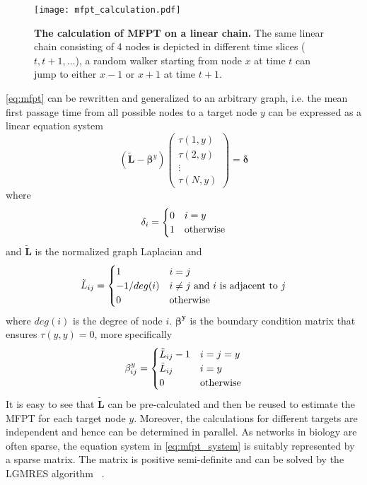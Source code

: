 \begin{figure}[!ht]
\begin{center}
\texttt{[image: mfpt\_calculation.pdf]}
\end{center}
\caption[MFPT calculation]{
{\bf The calculation of MFPT on a linear chain.}
The same linear chain consisting of 4 nodes is depicted in different time 
slices ($t,t+1,\ldots$), 
a random walker starting from node $x$ at time $t$ can jump to either $x-1$ 
or $x+1$ at time $t+1$.
}
\label{fig:mfpt_calculation}
\end{figure}

\ref{eq:mfpt} can be rewritten and generalized to an arbitrary graph, i.e.
the mean first passage time from all possible nodes to a target node $y$
can be expressed as a linear equation system
\begin{equation}
(\tilde{\mathbf{L}}-\boldsymbol{\beta}^y) 
\begin{pmatrix}
\tau(1,y)\\
\tau(2,y)\\
\vdots\\
\tau(N,y)
\end{pmatrix}
= \boldsymbol{\delta}
\label{eq:mfpt_system}
\end{equation}
where 
\begin{equation}
\delta_i=
\begin{cases}
0 & i=y\\
1 & \textnormal{otherwise}
\end{cases}
\end{equation}
and $\tilde{\mathbf{L}}$ is the normalized graph Laplacian and
\begin{equation}
\tilde{L}_{ij}=
\begin{cases}
1 & i=j\\
-1/deg(i) & i \neq j \ \textnormal{and}\ i \ \textnormal{is adjacent to}\ j \\
0 & \textnormal{otherwise}
\end{cases}
\end{equation}
where $deg(i)$ is the degree of node $i$. $\boldsymbol{\beta^y}$ 
is the boundary condition
matrix that ensures $\tau(y,y)=0$, more specifically
\begin{equation}
\beta^y_{ij}=
\begin{cases}
\tilde{L}_{ij}-1 & i=j=y\\
\tilde{L}_{ij} & i=y\\
0 & \textnormal{otherwise}
\end{cases}
\end{equation}
It is easy to see that $\tilde{\mathbf{L}}$ can be pre-calculated and then be 
reused to estimate the
MFPT for each target node $y$. Moreover, the calculations
for different targets are independent and hence can be
determined in parallel. As networks in biology are often
sparse, the equation system in \ref{eq:mfpt_system}
is suitably represented by a sparse matrix. The matrix
is positive semi-definite and can be solved by the LGMRES algorithm~%
\citep{Baker2005}.

